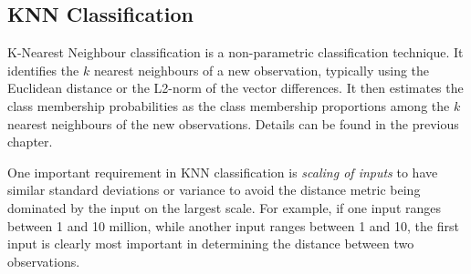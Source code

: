 \subsection{KNN Classification}

K-Nearest Neighbour classification is a non-parametric classification technique. It identifies the $k$ nearest neighbours of a new observation, typically using the Euclidean distance or the L2-norm of the vector differences. It then estimates the class membership probabilities as the class membership proportions among the $k$ nearest neighbours of the new observations. Details can be found in the previous chapter. 

One important requirement in KNN classification is \emph{scaling of inputs} to have similar standard deviations or variance to avoid the distance metric being dominated by the input on the largest scale. For example, if one input ranges between 1 and 10 million, while another input ranges between 1 and 10, the first input is clearly most important in determining the distance between two observations.

